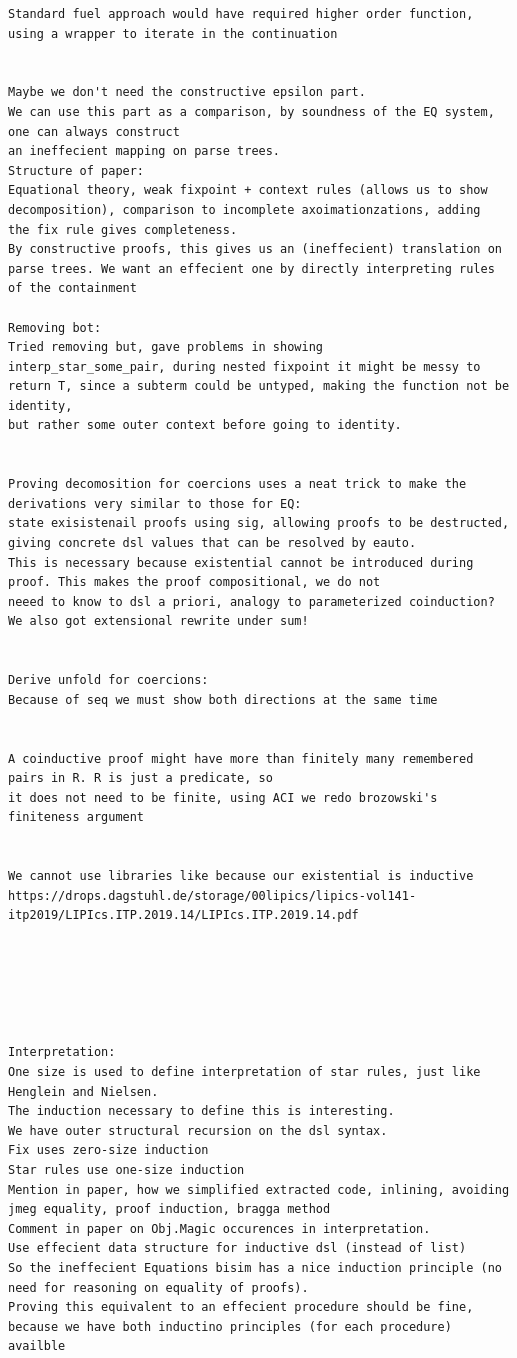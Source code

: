 \begin{verbatim}
Standard fuel approach would have required higher order function, using a wrapper to iterate in the continuation


Maybe we don't need the constructive epsilon part.
We can use this part as a comparison, by soundness of the EQ system, one can always construct 
an ineffecient mapping on parse trees. 
Structure of paper:
Equational theory, weak fixpoint + context rules (allows us to show decomposition), comparison to incomplete axoimationzations, adding
the fix rule gives completeness.
By constructive proofs, this gives us an (ineffecient) translation on parse trees. We want an effecient one by directly interpreting rules of the containment

Removing bot:
Tried removing but, gave problems in showing
interp_star_some_pair, during nested fixpoint it might be messy to return T, since a subterm could be untyped, making the function not be identity,
but rather some outer context before going to identity.


Proving decomosition for coercions uses a neat trick to make the derivations very similar to those for EQ:
state exisistenail proofs using sig, allowing proofs to be destructed, giving concrete dsl values that can be resolved by eauto.
This is necessary because existential cannot be introduced during proof. This makes the proof compositional, we do not 
neeed to know to dsl a priori, analogy to parameterized coinduction?
We also got extensional rewrite under sum!


Derive unfold for coercions:
Because of seq we must show both directions at the same time


A coinductive proof might have more than finitely many remembered pairs in R. R is just a predicate, so 
it does not need to be finite, using ACI we redo brozowski's finiteness argument


We cannot use libraries like because our existential is inductive 
https://drops.dagstuhl.de/storage/00lipics/lipics-vol141-itp2019/LIPIcs.ITP.2019.14/LIPIcs.ITP.2019.14.pdf






Interpretation:
One size is used to define interpretation of star rules, just like Henglein and Nielsen.
The induction necessary to define this is interesting.
We have outer structural recursion on the dsl syntax.
Fix uses zero-size induction
Star rules use one-size induction
Mention in paper, how we simplified extracted code, inlining, avoiding jmeg equality, proof induction, bragga method
Comment in paper on Obj.Magic occurences in interpretation.
Use effecient data structure for inductive dsl (instead of list)
So the ineffecient Equations bisim has a nice induction principle (no need for reasoning on equality of proofs).
Proving this equivalent to an effecient procedure should be fine, because we have both inductino principles (for each procedure) availble
\end{verbatim}

